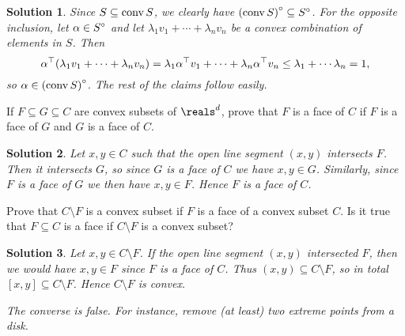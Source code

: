 \documentclass[article, a4paper, 11pt, oneside]{memoir}
\numberwithin{equation}{chapter}
\theoremstyle{nonumberplain}
\newtheorem{solution}{Solution}
\begin{document}
\begin{solution}
    Since $S \subseteq \operatorname{conv} S$, we clearly have ${(\operatorname{conv} S)}^{\circ} \subseteq {S}^{\circ}$. For the opposite inclusion, let $\alpha \in {S}^{\circ}$ and let $\lambda_1 v_1 + \cdots + \lambda_n v_n$ be a convex combination of elements in $S$. Then
    \begin{equation*}
        \alpha^{\top}(\lambda_1 v_1 + \cdots + \lambda_n v_n)
            = \lambda_1 \alpha^{\top} v_1 + \cdots + \lambda_n \alpha^{\top} v_n
            \leq \lambda_1 + \cdots \lambda_n
            = 1,
    \end{equation*}
    so $\alpha \in {(\operatorname{conv}S)}^{\circ}$. The rest of the claims follow easily.
\end{solution}


\begin{exerciseframed*}[10]
    If $F \subseteq G \subseteq C$ are convex subsets of $\reals^d$, prove that $F$ is a face of $C$ if $F$ is a face of $G$ and $G$ is a face of $C$.
\end{exerciseframed*}

\begin{solution}
    Let $x,y \in C$ such that the open line segment $(x,y)$ intersects $F$. Then it intersects $G$, so since $G$ is a face of $C$ we have $x,y \in G$. Similarly, since $F$ is a face of $G$ we then have $x,y \in F$. Hence $F$ is a face of $C$.
\end{solution}


\begin{exerciseframed*}[12]
    Prove that $C \setminus F$ is a convex subset if $F$ is a face of a convex subset $C$. Is it true that $F \subseteq C$ is a face if $C \setminus F$ is a convex subset?
\end{exerciseframed*}

\begin{solution}
    Let $x,y \in C \setminus F$. If the open line segment $(x,y)$ intersected $F$, then we would have $x,y \in F$ since $F$ is a face of $C$. Thus $(x,y) \subseteq C \setminus F$, so in total $[x,y] \subseteq C \setminus F$. Hence $C \setminus F$ is convex.

    The converse is false. For instance, remove (at least) two extreme points from a disk.
\end{solution}
\end{document}
